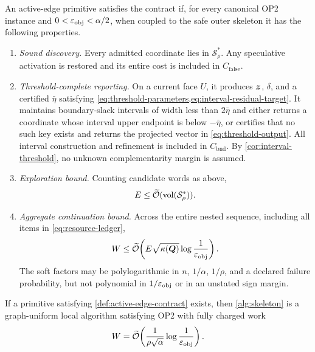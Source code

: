 \begin{definition}
\label{def:active-edge-contract}
An active-edge primitive satisfies the contract if, for every canonical OP2
instance and $0<\varepsilon_{\mathrm{obj}}<\alpha/2$, when coupled to the safe outer skeleton it
has the following properties.
\begin{enumerate}[label=(C\arabic*)]
\item \emph{Sound discovery.}  Every admitted coordinate lies in $\mathcal S_\rho^*$.
Any speculative activation is restored and its entire cost is included in
$C_{\mathrm{false}}$.
\item \emph{Threshold-complete reporting.}  On a current face $U$, it
produces $\bm{z}$, $\delta$, and a certified $\bar\eta$ satisfying
\cref{eq:threshold-parameters,eq:interval-residual-target}.  It maintains
boundary-slack intervals of width less than $2\bar\eta$ and either returns a
coordinate whose interval upper endpoint is below $-\bar\eta$, or certifies
that no such key exists and returns the projected vector in
\cref{eq:threshold-output}.  All interval construction and refinement is
included in $C_{\mathrm{bnd}}$.  By \cref{cor:interval-threshold}, no unknown
complementarity margin is assumed.
\item \emph{Exploration bound.}  Counting candidate words as above,
\begin{equation}
 E\leq\widetilde{\mathcal{O}}(\operatorname{vol}(\mathcal S_\rho^*)).
 \label{eq:exploration-contract}
\end{equation}
\item \emph{Aggregate continuation bound.}  Across the entire nested
sequence, including all items in \cref{eq:resource-ledger},
\begin{equation}
 W\leq\widetilde{\mathcal{O}}\!\left(
 E\sqrt{\kappa(\bm{Q})}\log\frac1{\varepsilon_{\mathrm{obj}}}
 \right).
 \label{eq:aggregate-contract}
\end{equation}
The soft factors may be polylogarithmic in $n$, $1/\alpha$, $1/\rho$, and a
declared failure probability, but not polynomial in $1/\varepsilon_{\mathrm{obj}}$ or in an
unstated sign margin.
\end{enumerate}
\end{definition}

\begin{theorem}
\label{thm:conditional-op2}
If a primitive satisfying \cref{def:active-edge-contract} exists, then
\cref{alg:skeleton} is a graph-uniform local algorithm satisfying OP2 with
fully charged work
\begin{equation}
 W=\widetilde{\mathcal{O}}\!\left(
   \frac{1}{\rho\sqrt\alpha}\log\frac1{\varepsilon_{\mathrm{obj}}}
 \right).
 \label{eq:conditional-op2-work}
\end{equation}
\end{theorem}

